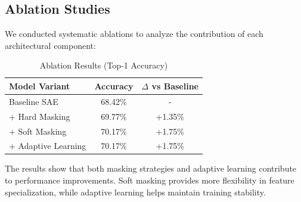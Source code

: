 \documentclass{article} %
\begin{document}
\subsection{Ablation Studies}
We conducted systematic ablations to analyze the contribution of each architectural component:

\begin{table}[h]
\centering
\caption{Ablation Results (Top-1 Accuracy)}
\begin{tabular}{lcc}
\toprule
Model Variant & Accuracy & $\Delta$ vs Baseline \\
\midrule
Baseline SAE & 68.42\% & - \\
+ Hard Masking & 69.77\% & +1.35\% \\
+ Soft Masking & 70.17\% & +1.75\% \\
+ Adaptive Learning & 70.17\% & +1.75\% \\
\bottomrule
\end{tabular}
\label{tab:ablation}
\end{table}

The results show that both masking strategies and adaptive learning contribute to performance improvements. Soft masking provides more flexibility in feature specialization, while adaptive learning helps maintain training stability.
\end{document}

